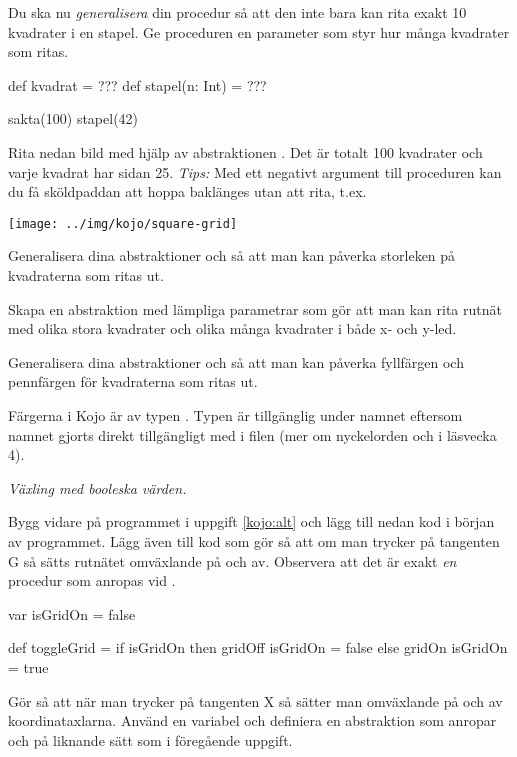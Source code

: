 \Subtask Du ska nu \emph{generalisera} din procedur så att den inte bara kan rita exakt 10 kvadrater i en stapel. Ge proceduren  en parameter  som styr hur många kvadrater som ritas.
\begin{Code}
def kvadrat = ???
def stapel(n: Int) = ???

sakta(100)
stapel(42)
\end{Code}



\Subtask Rita nedan bild med hjälp av abstraktionen . Det är totalt 100 kvadrater och varje kvadrat har sidan 25. \emph{Tips:} Med ett negativt argument till proceduren  kan du få sköldpaddan att hoppa baklänges utan att rita, t.ex. 

\texttt{[image: ../img/kojo/square-grid]}

\Subtask Generalisera dina abstraktioner  och  så att man kan påverka storleken på kvadraterna som ritas ut.

\Subtask Skapa en abstraktion  med lämpliga parametrar som gör att man kan rita rutnät med olika stora kvadrater och olika många kvadrater i både x- och y-led.

\Subtask Generalisera dina abstraktioner  och  så att man kan påverka fyllfärgen och pennfärgen för kvadraterna som ritas ut. 

Färgerna i Kojo är av typen . Typen är tillgänglig under namnet  eftersom namnet gjorts direkt tillgängligt med  i filen  (mer om nyckelorden  och  i läsvecka 4).


\Task \emph{Växling med booleska värden.}

\Subtask Bygg vidare på programmet i uppgift \ref{kojo:alt} och lägg till nedan kod i början av programmet. Lägg även till kod som gör så att om man trycker på tangenten G så sätts rutnätet omväxlande på och av. Observera att det är exakt \emph{en} procedur som anropas vid .

\begin{Code}
var isGridOn = false

def toggleGrid =
  if isGridOn then
    gridOff
    isGridOn = false
  else
    gridOn
    isGridOn = true
  
\end{Code}

\Subtask Gör så att när man trycker på tangenten X så sätter man omväxlande på och av koordinataxlarna. Använd en variabel  och definiera en abstraktion  som anropar  och  på liknande sätt som i föregående uppgift.


